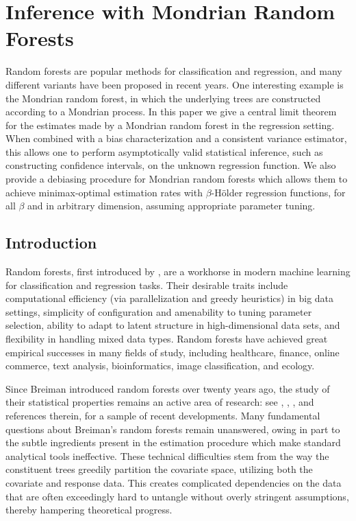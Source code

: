 
\chapter{Inference with Mondrian Random Forests}
\label{cha:mondrian}

Random forests are popular methods for classification and regression, and many
different variants have been proposed in recent years. One interesting example
is the Mondrian random forest, in which the underlying trees are constructed
according to a Mondrian process. In this paper we give a central limit theorem
for the estimates made by a Mondrian random forest in the regression setting.
When combined with a bias characterization and a consistent variance estimator,
this allows one to perform asymptotically valid statistical inference, such as
constructing confidence intervals, on the unknown regression function. We also
provide a debiasing procedure for Mondrian random forests which allows them to
achieve minimax-optimal estimation rates with $\beta$-H{\"o}lder regression
functions, for all $\beta$ and in arbitrary dimension, assuming appropriate
parameter tuning.

\section{Introduction}

Random forests, first introduced by \citet{breiman2001random},
are a workhorse in modern machine learning
for classification and regression tasks.
Their desirable traits include computational efficiency
(via parallelization and greedy heuristics)
in big data settings, simplicity of configuration and
amenability to tuning parameter selection, ability to
adapt to latent structure in high-dimensional data sets, and flexibility in
handling mixed data types.
Random forests have achieved great empirical successes in many
fields of study, including
healthcare, finance, online commerce,
text analysis, bioinformatics, image classification, and ecology.

Since Breiman introduced random forests over twenty years ago, the study of
their statistical properties remains an active area of research:
see \citet{Scornet-Biau-Vert_2015_AOS}, \citet{Chi-Vossler-Fan-Lv_2022_AOS},
\citet{klusowski2021universal}, and references therein, for a sample of recent
developments. Many fundamental questions about Breiman's random forests
remain unanswered, owing in part to the subtle ingredients
present in the estimation procedure which
make standard analytical tools ineffective.
These technical difficulties stem from the way the constituent trees greedily
partition the covariate space, utilizing both the covariate and response
data. This creates complicated dependencies on the data that are often
exceedingly hard to untangle without overly stringent assumptions, thereby
hampering theoretical progress.

